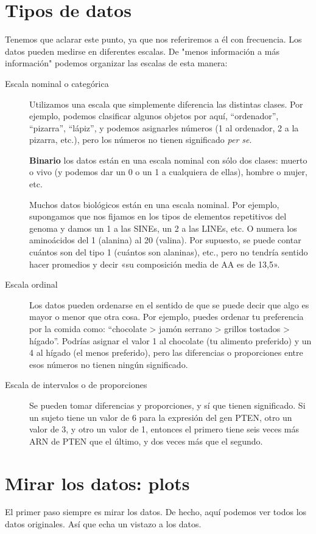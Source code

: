\documentclass{config/apuntes}\usepackage[]{graphicx}\usepackage[]{xcolor}
\begin{document}
\section{Tipos de datos}
Tenemos que aclarar este punto, ya que nos referiremos a él con frecuencia. Los datos pueden medirse en diferentes escalas. De "menos información a más información" podemos organizar las escalas de esta manera:
\begin{description}
\item[Escala nominal o categórica] Utilizamos una escala que simplemente diferencia las distintas clases. Por ejemplo, podemos clasificar algunos objetos por aquí, ``ordenador'', ``pizarra'', ``lápiz'', y podemos asignarles números (1 al ordenador, 2 a la pizarra, etc.), pero los números no tienen significado \textit{per se}.

\textbf{Binario} los datos están en una escala nominal con sólo dos clases: muerto o vivo (y podemos dar un 0 o un 1 a cualquiera de ellas), hombre o mujer, etc.

Muchos datos biológicos están en una escala nominal. Por ejemplo, supongamos que nos fijamos en los tipos de elementos repetitivos del genoma y damos un 1 a las SINEs, un 2 a las LINEs, etc. O numera los aminoácidos del 1 (alanina) al 20 (valina). Por supuesto, se puede contar cuántos son del tipo 1 (cuántos son alaninas), etc., pero no tendría sentido hacer promedios y decir «su composición media de AA es de 13,5».

\item[Escala ordinal] Los datos pueden ordenarse en el sentido de que se puede decir que algo es mayor o menor que otra cosa. Por ejemplo, puedes ordenar tu preferencia por la comida como: ``chocolate > jamón serrano > grillos tostados > hígado''. Podrías asignar el valor 1 al chocolate (tu alimento preferido) y un 4 al hígado (el menos preferido), pero las diferencias o proporciones entre esos números no tienen ningún significado.

\item[Escala de intervalos o de proporciones] Se pueden tomar diferencias y proporciones, y sí que tienen significado. Si un sujeto tiene un valor de 6 para la expresión del gen PTEN, otro un valor de 3, y otro un valor de 1, entonces el primero tiene seis veces más ARN de PTEN que el último, y dos veces más que el segundo.
\end{description}

\section{Mirar los datos: plots}
El primer paso siempre es mirar los datos. De hecho, aquí podemos ver todos los datos originales. Así que echa un vistazo a los datos.
\end{document}
